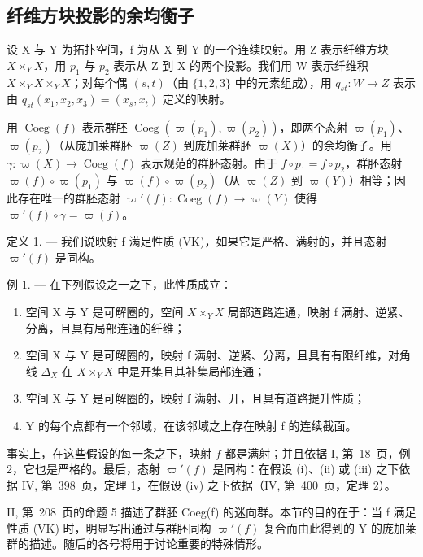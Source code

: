 \subsection{纤维方块投影的余均衡子}

设 X 与 Y 为拓扑空间，f 为从 X 到 Y 的一个连续映射。用 Z 表示纤维方块 \(X \times_{Y} X\)，用 \(p_{1}\) 与 \(p_{2}\) 表示从 Z 到 X 的两个投影。我们用 W 表示纤维积 \(X \times_{Y} X \times_{Y} X\)；对每个偶 \((s, t)\)（由 \(\{1,2,3\}\) 中的元素组成），用 \(q_{st}: W \to Z\) 表示由 \(q_{st}(x_{1}, x_{2}, x_{3}) = (x_{s}, x_{t})\) 定义的映射。

用 \(\operatorname{Coeg}(f)\) 表示群胚 \(\operatorname{Coeg}(\varpi(p_{1}),\varpi(p_{2}))\)，即两个态射 \(\varpi(p_{1})\)、\(\varpi(p_{2})\)（从庞加莱群胚 \(\varpi(Z)\) 到庞加莱群胚 \(\varpi(X)\)）的余均衡子。用 \(\gamma\colon\varpi(X)\to\operatorname{Coeg}(f)\) 表示规范的群胚态射。由于 \(f\circ p_{1}=f\circ p_{2}\)，群胚态射 \(\varpi(f)\circ\varpi(p_{1})\) 与 \(\varpi(f)\circ\varpi(p_{2})\)（从 \(\varpi(Z)\) 到 \(\varpi(Y)\)）相等；因此存在唯一的群胚态射 \(\varpi'(f)\colon\operatorname{Coeg}(f)\to\varpi(Y)\) 使得 \(\varpi'(f)\circ\gamma=\varpi(f)\)。

定义 1. --- 我们说映射 f 满足性质 (VK)，如果它是严格、满射的，并且态射 \(\varpi'(f)\) 是同构。

例 1. --- 在下列假设之一之下，此性质成立：

\begin{enumerate}
\def\labelenumi{(\roman{enumi})}
\item
  空间 X 与 Y 是可解圈的，空间 \(X \times_{Y} X\) 局部道路连通，映射 f 满射、逆紧、分离，且具有局部连通的纤维；
\item
  空间 X 与 Y 是可解圈的，映射 f 满射、逆紧、分离，且具有有限纤维，对角线 \(\Delta_{X}\) 在 \(X \times_{Y} X\) 中是开集且其补集局部连通；
\item
  空间 X 与 Y 是可解圈的，映射 f 满射、开，且具有道路提升性质；
\item
  Y 的每个点都有一个邻域，在该邻域之上存在映射 f 的连续截面。
\end{enumerate}

事实上，在这些假设的每一条之下，映射 \(f\) 都是满射；并且依据 I, 第~18~页，例 2，它也是严格的。最后，态射 \(\varpi'(f)\) 是同构：在假设 (i)、(ii) 或 (iii) 之下依据 IV, 第~398~页，定理 1，在假设 (iv) 之下依据（IV, 第~400~页，定理 2）。

II, 第~208~页的命题 5 描述了群胚 Coeg(f) 的迷向群。本节的目的在于：当 f 满足性质 (VK) 时，明显写出通过与群胚同构 \(\varpi'(f)\) 复合而由此得到的 Y 的庞加莱群的描述。随后的各号将用于讨论重要的特殊情形。

